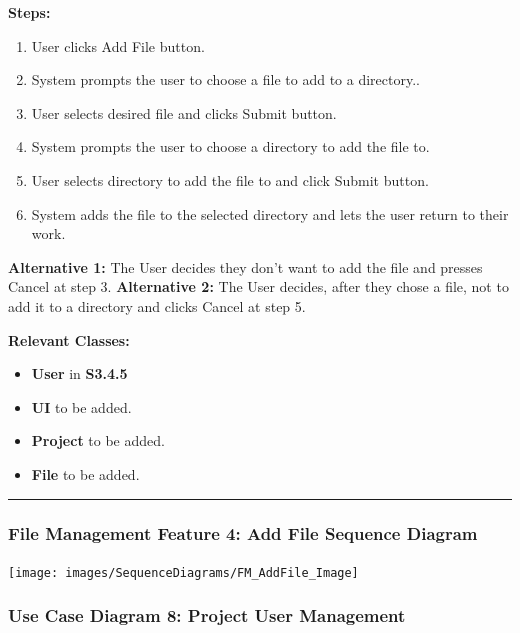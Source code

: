 \documentclass[twoside,letterpaper]{article}
\begin{document}
\noindent\textbf{Steps:} \begin{enumerate}
	\item User clicks Add File button.
	\item System prompts the user to choose a file to add to a directory..
	\item User selects desired file and clicks Submit button.
	\item System prompts the user to choose a directory to add the file to.
	\item User selects directory to add the file to and click Submit button.
	\item System adds the file to the selected directory and lets the user return to their work.

\end{enumerate}
\noindent\textbf{Alternative 1:} The User decides they don't want to add the file and presses Cancel at step 3. \newline
\noindent\textbf{Alternative 2:} The User decides, after they chose a file, not to add it to a directory and clicks Cancel at step 5. \newline

\noindent\textbf{Relevant Classes:}
\begin{itemize}
	\item \textbf{User} in \textbf{S3.4.5}
	\item \textbf{UI} to be added.
	\item \textbf{Project} to be added.
	\item \textbf{File} to be added.
\end{itemize}
\vspace{8pt}
\hrule
\bigskip

\newpage

\subsubsection[File Management Feature 4: Add File Sequence Diagram]{\rmfamily\bfseries\color{black}
	File Management Feature 4: Add File Sequence Diagram}
\hypertarget{RefHeading22059017292}{}

\texttt{[image: images/SequenceDiagrams/FM\_AddFile\_Image]}

\newpage

\subsubsection[Use Case Diagram 8: Project User Management]{\rmfamily\bfseries\color{black}
	Use Case Diagram 8: Project User Management}
\end{document}
